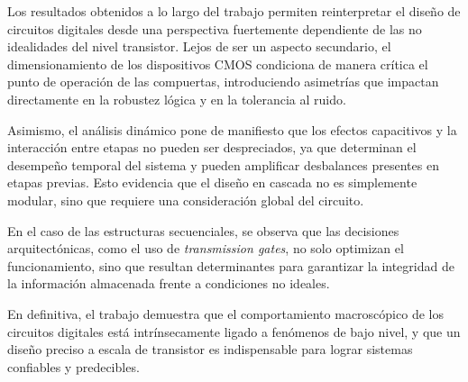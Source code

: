 Los resultados obtenidos a lo largo del trabajo permiten reinterpretar el diseño de circuitos digitales desde una perspectiva fuertemente dependiente de las no idealidades del nivel transistor. Lejos de ser un aspecto secundario, el dimensionamiento de los dispositivos CMOS condiciona de manera crítica el punto de operación de las compuertas, introduciendo asimetrías que impactan directamente en la robustez lógica y en la tolerancia al ruido.

Asimismo, el análisis dinámico pone de manifiesto que los efectos capacitivos y la interacción entre etapas no pueden ser despreciados, ya que determinan el desempeño temporal del sistema y pueden amplificar desbalances presentes en etapas previas. Esto evidencia que el diseño en cascada no es simplemente modular, sino que requiere una consideración global del circuito.

En el caso de las estructuras secuenciales, se observa que las decisiones arquitectónicas, como el uso de \textit{transmission gates}, no solo optimizan el funcionamiento, sino que resultan determinantes para garantizar la integridad de la información almacenada frente a condiciones no ideales.

En definitiva, el trabajo demuestra que el comportamiento macroscópico de los circuitos digitales está intrínsecamente ligado a fenómenos de bajo nivel, y que un diseño preciso a escala de transistor es indispensable para lograr sistemas confiables y predecibles.